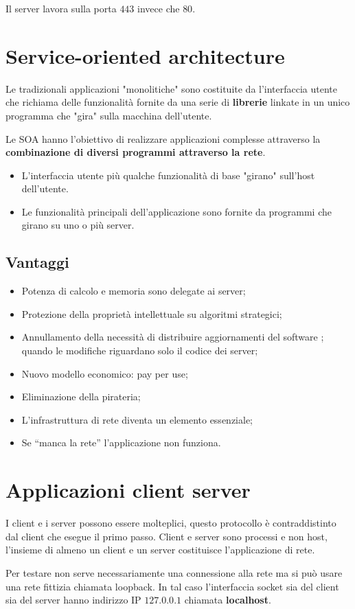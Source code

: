 \documentclass[oneside,a4paper,11pt]{book}
\theoremstyle{italicstyle}
\theoremstyle{normStyle}
\begin{document}
Il server lavora sulla porta $443$ invece che $80$.
\section{Service-oriented architecture}
Le tradizionali applicazioni "monolitiche" sono costituite da l'interfaccia utente che 
richiama delle funzionalità fornite da una serie di \textbf{librerie} linkate 
in un unico programma che "gira" sulla macchina dell'utente.

Le SOA hanno l'obiettivo di realizzare applicazioni complesse attraverso la 
\textbf{combinazione di diversi programmi attraverso la rete}.
\begin{itemize}
  \item L'interfaccia utente più qualche funzionalità di base "girano" sull'host dell'utente.
  \item Le funzionalità principali dell’applicazione sono fornite da programmi che girano su uno o più server.
\end{itemize}
\subsection{Vantaggi}
\begin{itemize}
  \item Potenza di calcolo e memoria sono delegate ai server;
  \item Protezione della proprietà intellettuale su algoritmi strategici;
  \item Annullamento della necessità di distribuire aggiornamenti del software ;
  quando le modifiche riguardano solo il codice dei server;
  \item Nuovo modello economico: pay per use;
  \item Eliminazione della pirateria;
  \item L’infrastruttura di rete diventa un elemento essenziale;
  \item Se “manca la rete” l’applicazione non funziona.
\end{itemize}
\section{Applicazioni client server}
I client e i server possono essere molteplici, questo protocollo 
è contraddistinto dal client che esegue il primo passo.
Client e server sono processi e non host, l'insieme 
di almeno un client e un server costituisce l'applicazione 
di rete.

Per testare non serve necessariamente una connessione alla rete ma si 
può usare una rete fittizia chiamata loopback. In tal caso l'interfaccia 
socket sia del client sia del server hanno indirizzo IP $127.0.0.1$ chiamata
\textbf{localhost}.
\end{document}
